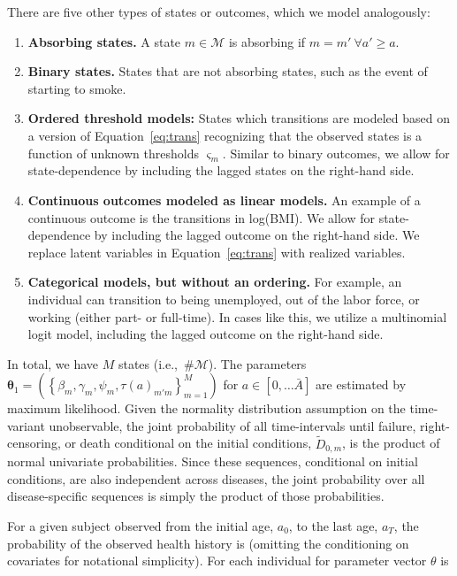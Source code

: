 \noindent There are five other types of states or outcomes, which we model analogously: 

\begin{enumerate}
\item \textbf{Absorbing states.} A state $m \in \mathcal{M}$ is absorbing if $m = m'  \ \forall a' \geq a$.
\item \textbf{Binary states.} States that are not absorbing states, such as the event of starting to smoke.
\item \textbf{Ordered threshold models:} States which transitions are modeled based on a version of Equation~\eqref{eq:trans} recognizing that the observed states is a function of unknown thresholds $\varsigma_m$. Similar to binary outcomes, we allow for state-dependence by including the lagged states on the right-hand side.
\item \textbf{Continuous outcomes modeled as linear models.} An example of a continuous outcome is the
transitions in log(BMI). We allow for state-dependence by including the lagged outcome on the right-hand side. We replace latent variables in Equation~\ref{eq:trans} with realized variables.
\item \textbf{Categorical models, but without an ordering.} For example, an individual can transition
to being unemployed, out of the labor force, or working (either part- or full-time). In cases like this, we utilize
a multinomial logit model, including the lagged outcome on the right-hand side.
\end{enumerate}

\noindent In total, we have $M$ states (i.e.,\ $\# \mathcal{M}$). The parameters $\mathbf{\theta}_1 = \left(\left\{\beta_m, \gamma_m, \psi_m,  \tau \left( a \right) _{m'm} \right\}_{m=1}^M \right)$ for $a \in [0, \ldots \bar{A} ]$ are estimated by maximum likelihood. Given the normality distribution assumption on the time-variant unobservable, the joint probability of all time-intervals until failure, right-censoring, or death conditional on the initial conditions, $\tilde{D}_{0,m}$, is the product of normal univariate probabilities. Since these sequences, conditional on initial conditions, are also independent across diseases, the joint probability over all disease-specific sequences is simply the product of those probabilities.

\noindent For a given subject observed from the initial age, $a_{0}$, to the last age, $a_{T}$, the probability of the observed health history is (omitting the conditioning on covariates for notational simplicity). For each individual for parameter vector $\theta$ is

